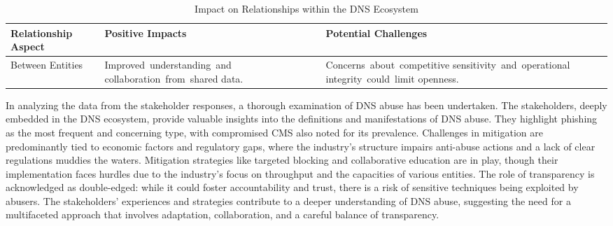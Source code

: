 {

\begin{table}[H]
\centering
\footnotesize 
\begin{tabular}{|l|p{4cm}|p{4cm}|}
\hline
\textbf{Relationship Aspect} & \textbf{Positive Impacts} & \textbf{Potential Challenges} \\
\hline
Between Entities & \mbox {Improved understanding and} \mbox {collaboration from shared} data. & \mbox {Concerns about competitive} \mbox {sensitivity and operational} \mbox {integrity could limit} openness. \\
\hline
\end{tabular}
\caption{Impact on Relationships within the DNS Ecosystem}
\label{table:impact_on_relationships}
\end{table}
}

In analyzing the data from the stakeholder responses, a thorough examination of DNS abuse has been undertaken. The stakeholders, deeply embedded in the DNS ecosystem, provide valuable insights into the definitions and manifestations of DNS abuse. They highlight phishing as the most frequent and concerning type, with compromised CMS also noted for its prevalence. Challenges in mitigation are predominantly tied to economic factors and regulatory gaps, where the industry's structure impairs anti-abuse actions and a lack of clear regulations muddies the waters. Mitigation strategies like targeted blocking and collaborative education are in play, though their implementation faces hurdles due to the industry's focus on throughput and the capacities of various entities. The role of transparency is acknowledged as double-edged: while it could foster accountability and trust, there is a risk of sensitive techniques being exploited by abusers. The stakeholders' experiences and strategies contribute to a deeper understanding of DNS abuse, suggesting the need for a multifaceted approach that involves adaptation, collaboration, and a careful balance of transparency.

